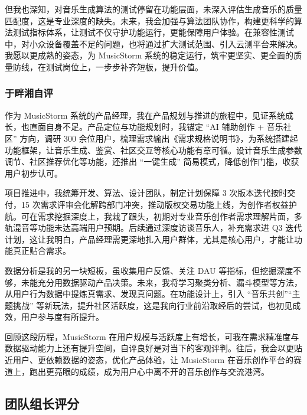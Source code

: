 \documentclass{base}
\numberwithin{figure}{section} %
\begin{document}
但我也深知，对音乐生成算法的测试停留在功能层面，未深入评估生成音乐的质量匹配度，这是专业深度的缺失。未来，我会加强与算法团队协作，构建更科学的算法测试指标体系，让测试不仅守护功能运行，更能保障用户体验。在兼容性测试中，对小众设备覆盖不足的问题，也将通过扩大测试范围、引入云测平台来解决。我愿以更成熟的姿态，为 MusicStorm 系统的稳定运行，筑牢更坚实、更全面的质量防线，在测试岗位上，一步步补齐短板，提升价值。

\vfill
\pagebreak
\clearpage
\thispagestyle{empty}
\null
\newpage

\subsubsection{于畔湘自评}

作为 MusicStorm 系统的产品经理，我在产品规划与推进的旅程中，见证系统成长，也直面自身不足。产品定位与功能规划时，我锚定 “AI 辅助创作 + 音乐社区” 方向，调研 300 余位用户，梳理需求输出《需求规格说明书》，为系统搭建起功能框架，让音乐生成、鉴赏、社区交互等核心功能有章可循。设计音乐生成参数调节、社区推荐优化等功能，还推出 “一键生成” 简易模式，降低创作门槛，收获用户初步认可。

项目推进中，我统筹开发、算法、设计团队，制定计划保障 3 次版本迭代按时交付，15 次需求评审会化解跨部门冲突，推动版权交易功能上线，为创作者权益护航。可在需求挖掘深度上，我栽了跟头，初期对专业音乐创作者需求理解片面，多轨混音等功能未达高端用户预期。后续通过深度访谈音乐人，补充需求进 Q3 迭代计划，这让我明白，产品经理需更深地扎入用户群体，尤其是核心用户，才能让功能真正贴合需求。

数据分析是我的另一块短板，虽收集用户反馈、关注 DAU 等指标，但挖掘深度不够，未能充分用数据驱动产品决策。未来，我将学习聚类分析、漏斗模型等方法，从用户行为数据中提炼真需求、发现真问题。在功能设计上，引入 “音乐共创”“主题挑战” 等新玩法，提升社区活跃度，这是我向行业前沿取经后的尝试，也初见成效，用户参与度有所提升。

回顾这段历程，MusicStorm 在用户规模与活跃度上有增长，可我在需求精准度与数据驱动能力上还有提升空间，自评良好是对当下的客观评判。往后，我会以更贴近用户、更依赖数据的姿态，优化产品体验，让 MusicStorm 在音乐创作平台的赛道上，跑出更亮眼的成绩，成为用户心中离不开的音乐创作与交流港湾。

\vfill
\pagebreak
\clearpage
\thispagestyle{empty}
\null
\newpage

\subsection{团队组长评分}
\end{document}
